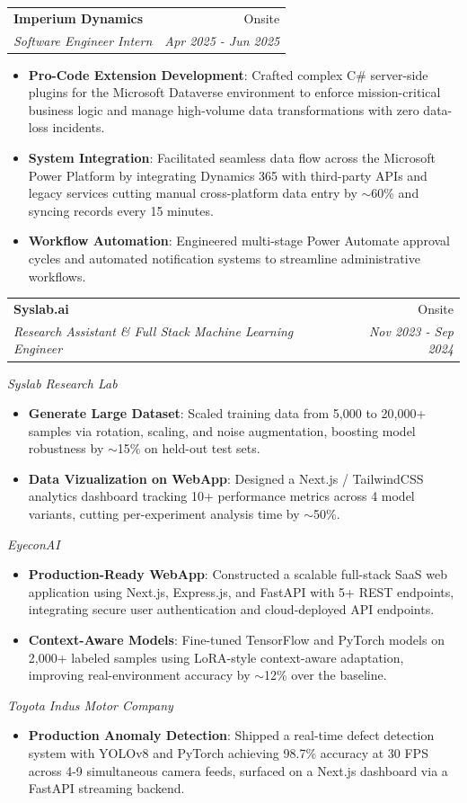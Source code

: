\documentclass[a4paper,20pt]{article}
\makeatletter
\newcommand{\resumeItem}[2]{
  \item\small{
    \textbf{#1}{: #2 \vspace{-2pt}}
  }
}
\newcommand{\resumeSubheading}[4]{
  \vspace{-1pt}\item
    \begin{tabular*}{0.97\textwidth}{l@{\extracolsep{\fill}}r}
      \textbf{#1} & #2 \\
      \textit{#3} & \textit{#4} \\
    \end{tabular*}\vspace{-5pt}
}
\newcommand{\resumeSubSubheading}[1]{%
  \par\vspace{4pt}%
  \noindent\textit{\small #1}%
  \par\vspace{-4pt}%
}
\newcommand{\resumeItemListStart}{\begin{itemize}}
\newcommand{\resumeItemListEnd}{\end{itemize}\vspace{-5pt}}
\makeatother
\begin{document}
    \vspace{5pt}

    \resumeSubheading
      {Imperium Dynamics}{Onsite}
      {Software Engineer Intern}{Apr 2025 - Jun 2025}
      \resumeItemListStart
        \resumeItem{Pro-Code Extension Development}
        {Crafted complex C\# server-side plugins for the Microsoft Dataverse environment to enforce mission-critical business logic and manage high-volume data transformations with zero data-loss incidents.}
        \resumeItem{System Integration}
        {Facilitated seamless data flow across the Microsoft Power Platform by integrating Dynamics 365 with third-party APIs and legacy services cutting manual cross-platform data entry by $\sim$60\% and syncing records every 15 minutes.}
        \resumeItem{Workflow Automation}
        {Engineered multi-stage Power Automate approval cycles and automated notification systems to streamline administrative workflows.}
      \resumeItemListEnd

    \vspace{5pt}

    \resumeSubheading{Syslab.ai}{Onsite}
      {Research Assistant \& Full Stack Machine Learning Engineer}{Nov 2023 - Sep 2024}
      \resumeSubSubheading{Syslab Research Lab}
      \resumeItemListStart
        \resumeItem{Generate Large Dataset}
        {Scaled training data from 5,000 to 20,000+ samples via rotation, scaling, and noise augmentation, boosting model robustness by $\sim$15\% on held-out test sets.}
        \resumeItem{Data Vizualization on WebApp}
        {Designed a Next.js / TailwindCSS analytics dashboard tracking 10+ performance metrics across 4 model variants, cutting per-experiment analysis time by $\sim$50\%.}
      \resumeItemListEnd
      \resumeSubSubheading{EyeconAI}
      \resumeItemListStart
        \resumeItem{Production-Ready WebApp}
        {Constructed a scalable full-stack SaaS web application using Next.js, Express.js, and FastAPI with 5+ REST endpoints, integrating secure user authentication and cloud-deployed API endpoints.}
        \resumeItem{Context-Aware Models}
        {Fine-tuned TensorFlow and PyTorch models on 2,000+ labeled samples using LoRA-style context-aware adaptation, improving real-environment accuracy by $\sim$12\% over the baseline.}
      \resumeItemListEnd
      \resumeSubSubheading{Toyota Indus Motor Company}
      \resumeItemListStart
        \resumeItem{Production Anomaly Detection}
        {Shipped a real-time defect detection system with YOLOv8 and PyTorch achieving 98.7\% accuracy at 30 FPS across 4-9 simultaneous camera feeds, surfaced on a Next.js dashboard via a FastAPI streaming backend.}
      \resumeItemListEnd
\end{document}
